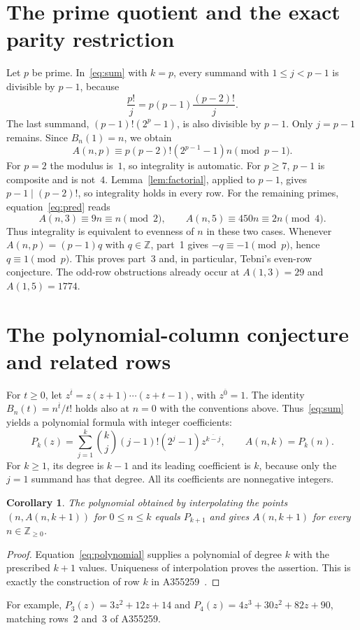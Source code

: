 \documentclass[11pt]{article}
\newtheorem{corollary}[theorem]{Corollary}
\newcommand{\Nzero}{\mathbb{Z}_{\geq0}}
\newcommand{\rise}[2]{#1^{\overline{#2}}}
\begin{document}
\section{The prime quotient and the exact parity restriction}
Let $p$ be prime. In~\eqref{eq:sum} with $k=p$, every summand
with $1\leq j<p-1$ is divisible by $p-1$, because
\[
 \frac{p!}{j}=p(p-1)\frac{(p-2)!}{j}.
\]
The last summand, $(p-1)!(2^p-1)$, is also divisible by $p-1$.
Only $j=p-1$ remains. Since $B_n(1)=n$, we obtain
\begin{equation}\label{eq:pred}
 A(n,p)\equiv p(p-2)!(2^{p-1}-1)n\pmod{p-1}.
\end{equation}
For $p=2$ the modulus is~$1$, so integrality is automatic.
For $p\geq7$, $p-1$ is composite and is not~$4$.
Lemma~\ref{lem:factorial}, applied to $p-1$, gives
$p-1\mid(p-2)!$, so integrality holds in every row.
For the remaining primes, equation~\eqref{eq:pred} reads
\[
 A(n,3)\equiv9n\equiv n\pmod2,\qquad
 A(n,5)\equiv450n\equiv2n\pmod4.
\]
Thus integrality is equivalent to evenness of $n$ in these two cases.
Whenever $A(n,p)=(p-1)q$ with $q\in\mathbb{Z}$, part~1 gives
$-q\equiv-1\pmod p$, hence $q\equiv1\pmod p$.
This proves part~3 and, in particular, Tebni's even-row conjecture.
The odd-row obstructions already occur at $A(1,3)=29$ and
$A(1,5)=1774$.

\section{The polynomial-column conjecture and related rows}
For $t\geq0$, let $\rise{z}{t}=z(z+1)\cdots(z+t-1)$,
with $\rise{z}{0}=1$. The identity
$B_n(t)=\rise{n}{t}/t!$ holds also at $n=0$ with the conventions
above. Thus~\eqref{eq:sum} yields a polynomial formula with integer
coefficients:
\begin{equation}\label{eq:polynomial}
 P_k(z)=\sum_{j=1}^k\binom{k}{j}(j-1)!(2^j-1)\rise{z}{k-j},
 \qquad A(n,k)=P_k(n).
\end{equation}
For $k\geq1$, its degree is $k-1$ and its leading coefficient is
$k$, because only the $j=1$ summand has that degree. All its
coefficients are nonnegative integers.

\begin{corollary}\label{cor:polynomial}
The polynomial obtained by interpolating the points
$(n,A(n,k+1))$ for $0\leq n\leq k$ equals $P_{k+1}$ and gives
$A(n,k+1)$ for every $n\in\Nzero$.
\end{corollary}
\begin{proof}
Equation~\eqref{eq:polynomial} supplies a polynomial of degree $k$
with the prescribed $k+1$ values. Uniqueness of interpolation proves
the assertion. This is exactly the construction of row $k$ in
A355259~\cite[Name, Comments and Maple program]{polynomials}.
\end{proof}
For example, $P_3(z)=3z^2+12z+14$ and
$P_4(z)=4z^3+30z^2+82z+90$, matching rows~2 and~3 of A355259.
\end{document}
